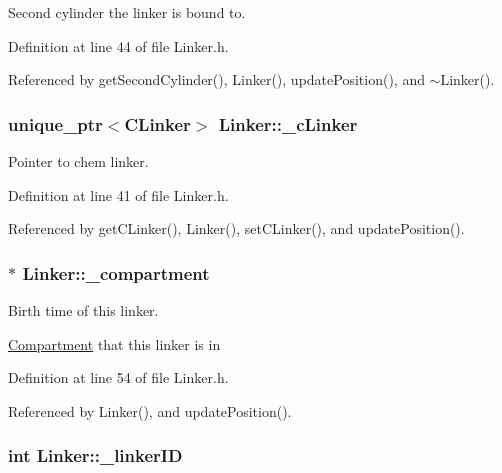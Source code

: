 Second cylinder the linker is bound to. 



Definition at line 44 of file Linker.\+h.



Referenced by get\+Second\+Cylinder(), Linker(), update\+Position(), and $\sim$\+Linker().

\hypertarget{classLinker_a6cbe666ab89dd1b4ed0eae03d8f25d63}{
\subsubsection[{\+\_\+c\+Linker}]{\setlength{\rightskip}{0pt plus 5cm}unique\+\_\+ptr$<${\bf C\+Linker}$>$ Linker\+::\+\_\+c\+Linker\hspace{0.3cm}{\ttfamily [private]}}}\label{classLinker_a6cbe666ab89dd1b4ed0eae03d8f25d63}


Pointer to chem linker. 



Definition at line 41 of file Linker.\+h.



Referenced by get\+C\+Linker(), Linker(), set\+C\+Linker(), and update\+Position().

\hypertarget{classLinker_a1392148aae77282b3b651e21abd529a7}{
\subsubsection[{\+\_\+compartment}]{$\ast$ Linker\+::\+\_\+compartment\hspace{0.3cm}{\ttfamily [private]}}}\label{classLinker_a1392148aae77282b3b651e21abd529a7}


Birth time of this linker. 

\hyperlink{classCompartment}{Compartment} that this linker is in 

Definition at line 54 of file Linker.\+h.



Referenced by Linker(), and update\+Position().

\hypertarget{classLinker_a980a8c48b4642a13b409dcdb857028f9}{
\subsubsection[{\+\_\+linker\+I\+D}]{\setlength{\rightskip}{0pt plus 5cm}int Linker\+::\+\_\+linker\+I\+D\hspace{0.3cm}{\ttfamily [private]}}}\label{classLinker_a980a8c48b4642a13b409dcdb857028f9}


